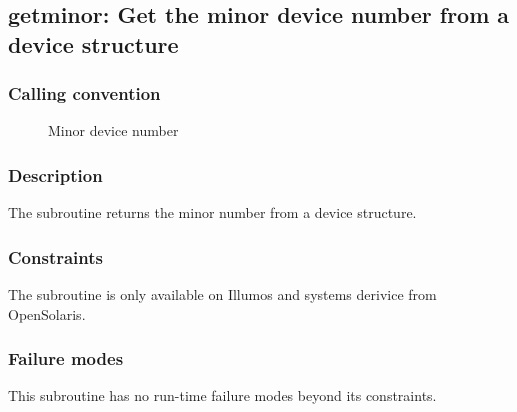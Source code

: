 \clearpage
{}
{}
\label{subr:getminor}
\subsection*{getminor: Get the minor device number from a device structure}

\subsubsection*{Calling convention}

\begin{description}
\item[] Minor device number
\end{description}

\subsubsection*{Description}

The  subroutine returns the minor number from a
device structure.

\subsubsection*{Constraints}

The  subroutine is only available on Illumos and
systems derivice from OpenSolaris.

\subsubsection*{Failure modes}

This subroutine has no run-time failure modes beyond its constraints.
